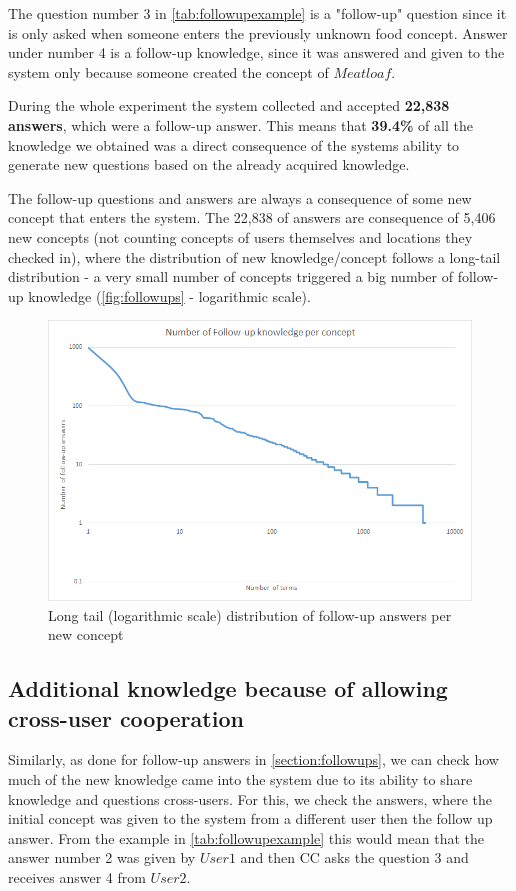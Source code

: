 {The question number 3 in \autoref{tab:followupexample} is a "follow-up" question
since it is only asked when someone enters the previously unknown food concept. 
Answer under number 4 is a follow-up knowledge, since it was answered and given 
to the system only because someone created the concept of $Meatloaf$.

During the whole experiment the system collected and accepted \textbf{22,838 
answers}, which were a follow-up answer. This means that \textbf{39.4\%} of all
the knowledge we obtained was a direct consequence of the systems ability to 
generate new questions based on the already acquired knowledge.

The follow-up questions and answers are always a consequence of some new 
concept that enters the system. The 22,838 of answers are consequence of 
5,406 new concepts (not counting concepts of users themselves and locations 
they checked in), where the distribution of new knowledge/concept follows a 
long-tail distribution - a very small number of concepts triggered a big number
of follow-up knowledge (\autoref{fig:followups} - logarithmic scale).

\begin{figure}[H]
	\centering
		\includegraphics[width=1\textwidth]{figures/followupGraph.png}
	\caption{Long tail (logarithmic scale) distribution of follow-up answers per new concept}
	\label{fig:followups}
\end{figure}

\subsection{Additional knowledge because of allowing cross-user cooperation}
\label{section:resultscross}
Similarly, as done for follow-up answers in \autoref{section:followups}, we can
check how much of the new knowledge came into the system due to its ability to 
share knowledge and questions cross-users. For this, we check the answers, 
where the initial concept was given to the system from a different user then the
follow up answer. From the example in \autoref{tab:followupexample} this would 
mean that the answer number 2 was given by $User1$ and then CC asks the 
question 3 and receives answer 4 from $User2$.

}
